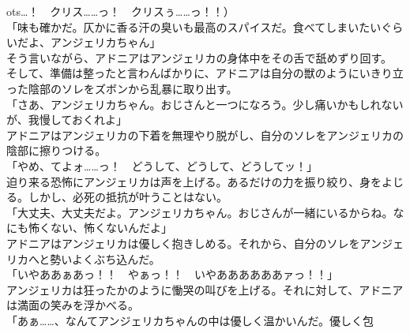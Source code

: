 \documentclass[b5j,10pt,openany]{jsbook}
\begin{document}
ots{}\ldots{}！　クリス\ldots{}\ldots{}っ！　クリスぅ\ldots{}\ldots{}っ！！）\\「味も確かだ。仄かに香る汗の臭いも最高のスパイスだ。食べてしまいたいぐらいだよ、アンジェリカちゃん」\\そう言いながら、アドニアはアンジェリカの身体中をその舌で舐めずり回す。\\そして、準備は整ったと言わんばかりに、アドニアは自分の獣のようにいきり立った陰部のソレをズボンから乱暴に取り出す。\\「さあ、アンジェリカちゃん。おじさんと一つになろう。少し痛いかもしれないが、我慢しておくれよ」\\アドニアはアンジェリカの下着を無理やり脱がし、自分のソレをアンジェリカの陰部に擦りつける。\\「やめ、てよォ\ldots{}\ldots{}っ！　どうして、どうして、どうしてッ！」\\迫り来る恐怖にアンジェリカは声を上げる。あるだけの力を振り絞り、身をよじる。しかし、必死の抵抗が叶うことはない。\\「大丈夫、大丈夫だよ。アンジェリカちゃん。おじさんが一緒にいるからね。なにも怖くない、怖くないんだよ」\\アドニアはアンジェリカは優しく抱きしめる。それから、自分のソレをアンジェリカへと勢いよくぶち込んだ。\\「いやああぁあっ！！　やぁっ！！　いやああああああァっ！！」\\アンジェリカは狂ったかのように慟哭の叫びを上げる。それに対して、アドニアは満面の笑みを浮かべる。\\「あぁ\ldots{}\ldots{}、なんてアンジェリカちゃんの中は優しく温かいんだ。優しく包
\end{document}
